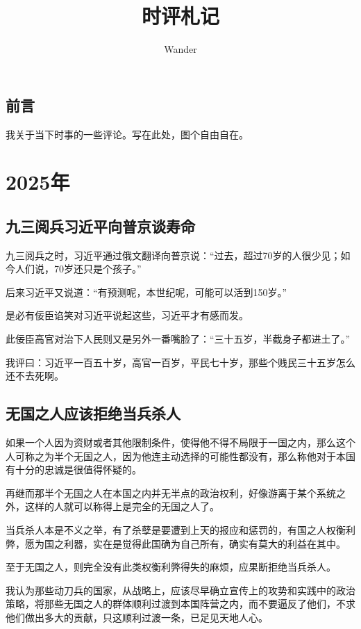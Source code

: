 \documentclass[12pt,oneside]{book}
\title{时评札记}
\author{Wander}
\begin{document}
\makemytitle



\frontmatter 
{}
\chapter*{前言}
我关于当下时事的一些评论。写在此处，图个自由自在。



\setcounter{tocdepth}{2}    
\tableofcontents


\mainmatter


\part{2025年}
\chapter{九三阅兵习近平向普京谈寿命}
九三阅兵之时，习近平通过俄文翻译向普京说：“过去，超过70岁的人很少见；如今人们说，70岁还只是个孩子。”

后来习近平又说道：“有预测呢，本世纪呢，可能可以活到150岁。”

是必有佞臣谄笑对习近平说起这些，习近平才有感而发。

此佞臣高官对治下人民则又是另外一番嘴脸了：“三十五岁，半截身子都进土了。”

我评曰：习近平一百五十岁，高官一百岁，平民七十岁，那些个贱民三十五岁怎么还不去死啊。


\chapter{无国之人应该拒绝当兵杀人}
如果一个人因为资财或者其他限制条件，使得他不得不局限于一国之内，那么这个人可称之为半个无国之人，因为他连主动选择的可能性都没有，那么称他对于本国有十分的忠诚是很值得怀疑的。

再继而那半个无国之人在本国之内并无半点的政治权利，好像游离于某个系统之外，这样的人就可以称得上是完全的无国之人了。

当兵杀人本是不义之举，有了杀孽是要遭到上天的报应和惩罚的，有国之人权衡利弊，愿为国之利器，实在是觉得此国确为自己所有，确实有莫大的利益在其中。

至于无国之人，则完全没有此类权衡利弊得失的麻烦，应果断拒绝当兵杀人。

我认为那些动刀兵的国家，从战略上，应该尽早确立宣传上的攻势和实践中的政治策略，将那些无国之人的群体顺利过渡到本国阵营之内，而不要逼反了他们，不求他们做出多大的贡献，只这顺利过渡一条，已足见天地人心。
\end{document}
